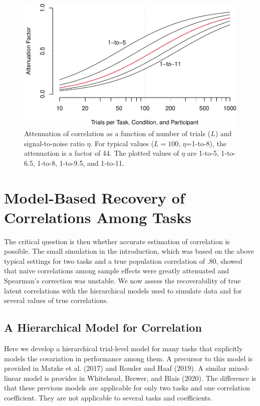 \documentclass[
  english,
  ,man]{apa6}
\begin{document}
\begin{figure}
\centering
\includegraphics{p_files/figure-latex/attenuate-1.pdf}
\caption{\label{fig:attenuate}Attenuation of correlation as a function of number of trials (\(L\)) and signal-to-noise ratio \(\eta\). For typical values (\(L=100\), \(\eta\)=1-to-8), the attenuation is a factor of 44. The plotted values of \(\eta\) are 1-to-5, 1-to-6.5, 1-to-8, 1-to-9.5, and 1-to-11.}
\end{figure}

\hypertarget{model-based-recovery-of-correlations-among-tasks}{%
\section{Model-Based Recovery of Correlations Among Tasks}\label{model-based-recovery-of-correlations-among-tasks}}

The critical question is then whether accurate estimation of correlation is possible. The small simulation in the introduction, which was based on the above typical settings for two tasks and a true population correlation of .80, showed that naive correlations among sample effects were greatly attenuated and Spearman's correction was unstable. We now assess the recoverability of true latent correlations with the hierarchical models used to simulate data and for several values of true correlations.

\hypertarget{a-hierarchical-model-for-correlation}{%
\subsection{A Hierarchical Model for Correlation}\label{a-hierarchical-model-for-correlation}}

Here we develop a hierarchical trial-level model for many tasks that explicitly models the covariation in performance among them. A precursor to this model is provided in Matzke et al. (2017) and Rouder and Haaf (2019). A similar mixed-linear model is provides in Whitehead, Brewer, and Blais (2020). The difference is that these previous models are applicable for only two tasks and one correlation coefficient. They are not applicable to several tasks and coefficients.
\end{document}
